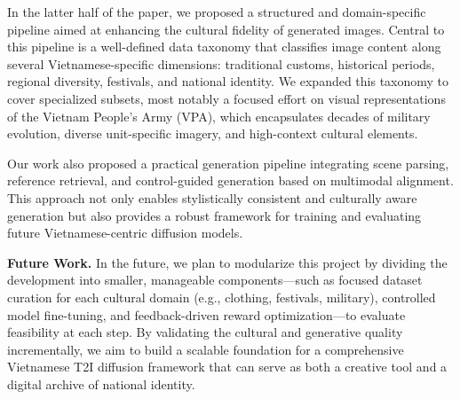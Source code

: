 \documentclass[conference]{IEEEtran}
\begin{document}
In the latter half of the paper, we proposed a structured and domain-specific pipeline aimed at enhancing the cultural fidelity of generated images. Central to this pipeline is a well-defined data taxonomy that classifies image content along several Vietnamese-specific dimensions: traditional customs, historical periods, regional diversity, festivals, and national identity. We expanded this taxonomy to cover specialized subsets, most notably a focused effort on visual representations of the Vietnam People's Army (VPA), which encapsulates decades of military evolution, diverse unit-specific imagery, and high-context cultural elements.

Our work also proposed a practical generation pipeline integrating scene parsing, reference retrieval, and control-guided generation based on multimodal alignment. This approach not only enables stylistically consistent and culturally aware generation but also provides a robust framework for training and evaluating future Vietnamese-centric diffusion models.

\vspace{0.5em}
\textbf{Future Work.} In the future, we plan to modularize this project by dividing the development into smaller, manageable components—such as focused dataset curation for each cultural domain (e.g., clothing, festivals, military), controlled model fine-tuning, and feedback-driven reward optimization—to evaluate feasibility at each step. By validating the cultural and generative quality incrementally, we aim to build a scalable foundation for a comprehensive Vietnamese T2I diffusion framework that can serve as both a creative tool and a digital archive of national identity.



\vspace{12pt}
\end{document}
